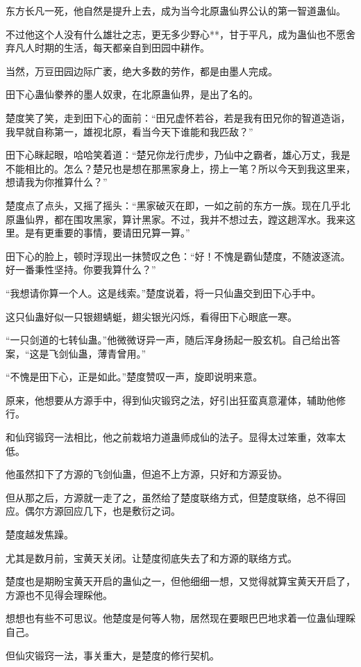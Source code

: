 \begin{this_body}
东方长凡一死，他自然是提升上去，成为当今北原蛊仙界公认的第一智道蛊仙。

不过他这个人没有什么雄壮之志，更无多少野心**，甘于平凡，成为蛊仙也不愿舍弃凡人时期的生活，每天都亲自到田园中耕作。

当然，万豆田园边际广袤，绝大多数的劳作，都是由墨人完成。

田下心蛊仙豢养的墨人奴隶，在北原蛊仙界，是出了名的。

楚度笑了笑，走到田下心的面前：“田兄虚怀若谷，若是我有田兄你的智道造诣，我早就自称第一，雄视北原，看当今天下谁能和我匹敌？”

田下心眯起眼，哈哈笑着道：“楚兄你龙行虎步，乃仙中之霸者，雄心万丈，我是不能相比的。怎么？楚兄也是想在那黑家身上，捞上一笔？所以今天到我这里来，想请我为你推算什么？”

楚度点了点头，又摇了摇头：“黑家破灭在即，一如之前的东方一族。现在几乎北原蛊仙界，都在围攻黑家，算计黑家。不过，我并不想过去，蹚这趟浑水。我来这里。是有更重要的事情，要请田兄算一算。”

田下心的脸上，顿时浮现出一抹赞叹之色：“好！不愧是霸仙楚度，不随波逐流。好一番秉性坚持。你要我算什么？”

“我想请你算一个人。这是线索。”楚度说着，将一只仙蛊交到田下心手中。

这只仙蛊好似一只银翅蜻蜓，翅尖银光闪烁，看得田下心眼底一寒。

“一只剑道的七转仙蛊。”他微微讶异一声，随后浑身扬起一股玄机。自己给出答案，“这是飞剑仙蛊，薄青曾用。”

“不愧是田下心，正是如此。”楚度赞叹一声，旋即说明来意。

原来，他想要从方源手中，得到仙灾锻窍之法，好引出狂蛮真意灌体，辅助他修行。

和仙窍锻窍一法相比，他之前栽培力道蛊师成仙的法子。显得太过笨重，效率太低。

他虽然扣下了方源的飞剑仙蛊，但追不上方源，只好和方源妥协。

但从那之后，方源就一走了之，虽然给了楚度联络方式，但楚度联络，总不得回应。偶尔方源回应几下，也是敷衍之词。

楚度越发焦躁。

尤其是数月前，宝黄天关闭。让楚度彻底失去了和方源的联络方式。

楚度也是期盼宝黄天开启的蛊仙之一，但他细细一想，又觉得就算宝黄天开启了，方源也不见得会理睬他。

想想也有些不可思议。他楚度是何等人物，居然现在要眼巴巴地求着一位蛊仙理睬自己。

但仙灾锻窍一法，事关重大，是楚度的修行契机。


\end{this_body}
